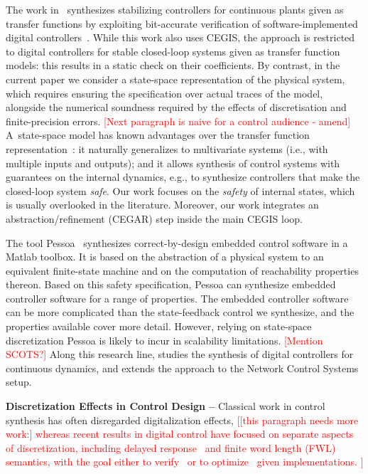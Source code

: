 \documentclass[twocolumn]{autart}    %
\renewcommand{\note}[1]{\textcolor{red}{[#1]}}
\begin{document}
The work in~\cite{hscc-paper} synthesizes stabilizing controllers for
continuous plants given as transfer functions by exploiting bit-accurate
verification of software-implemented digital controllers~\cite{Bessa16}. 
While this work also uses CEGIS, the approach is restricted to digital
controllers for stable closed-loop systems given as transfer function
models: this results in a static check on their coefficients.  By contrast,
in the current paper we consider a state-space representation of the
physical system, which requires ensuring the specification over actual
traces of the model, alongside the numerical soundness required by the
effects of discretisation and finite-precision errors.
\note{Next paragraph is naive for a control audience - amend} 
A~state-space model
has known advantages over the transfer function
representation~\cite{Franklin15}: it naturally generalizes to multivariate
systems (i.e., with multiple inputs and outputs); and it allows synthesis of
control systems with guarantees on the internal dynamics, e.g., to
synthesize controllers that make the closed-loop system \emph{safe}.  Our
work focuses on the \emph{safety} of internal states, which is usually
overlooked in the literature.  Moreover, our work integrates an
abstraction/refinement (CEGAR) step inside the main CEGIS loop.

The tool Pessoa~\cite{mazo2010pessoa} synthesizes correct-by-design embedded
control software in a Matlab toolbox.  It is based on the abstraction of a
physical system to an equivalent finite-state machine and on the computation
of reachability properties thereon.  Based on this safety specification,
\mbox{Pessoa} can synthesize embedded controller software for a range of
properties.  The embedded controller software can be more complicated than
the state-feedback control we synthesize, and the properties available cover
more detail.  However, relying on state-space discretization \mbox{Pessoa}
is likely to incur in scalability limitations.  \note{Mention SCOTS?}
Along this research line,
\cite{Anta2010,liu16} studies the synthesis of digital controllers for
continuous dynamics, and \cite{zamani2014} extends the approach to the Network Control Systems setup. 

\textbf{Discretization Effects in Control Design --}
Classical work in control synthesis has often disregarded digitalization effects, 
\note{[this paragraph needs more work:]
whereas recent results in digital control have focused on separate aspects of discretization, 
including delayed response~\cite{Duggirala2015} and finite word length (FWL) semantics, 
with the goal either to verify~\cite{daes20161} or to optimize~\cite{oudjida2014design} given implementations. }
\end{document}
